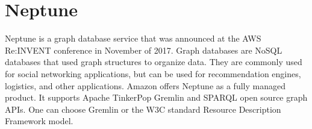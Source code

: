 \section{Neptune}

Neptune is a graph database service that was announced at the AWS
Re:INVENT conference in November of
2017\cite{hid-sp18-419-www-tc_neptune}. Graph databases are NoSQL
databases that used graph structures to organize
data\cite{hid-sp18-419-www-tp-graph-db}. They are commonly used for
social networking applications, but can be used for recommendation
engines, logistics, and other applications. Amazon offers Neptune as a
fully managed product. It supports Apache TinkerPop Gremlin and SPARQL
open source graph APIs. One can choose Gremlin or the W3C standard
Resource Description Framework
model\cite{hid-sp18-419-www-aws-neptune}.
